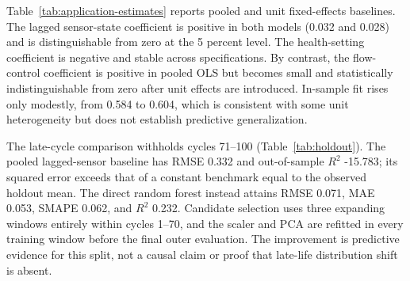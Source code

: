 \documentclass[article]{jss}
\begin{document}
\begin{table}[t!]
\centering
\small
\setlength{\tabcolsep}{4.5pt}
\renewcommand{\arraystretch}{1.16}

\caption{\label{tab:application-design} Leakage-controlled N-CMAPSS application design. Source: Author's computation from the processed N-CMAPSS DS01 panel (Artifacts 01 and 05). Notes: The target is a risk proxy derived from RUL. Lagged risk and lagged RUL are excluded because they encode a deterministic countdown identity.}
\end{table}


Table~\ref{tab:application-estimates} reports pooled and unit fixed-effects baselines. The lagged sensor-state
coefficient is positive in both models (0.032 and 0.028) and is distinguishable from zero at the 5 percent level.
The health-setting coefficient is negative and stable across specifications. By contrast, the flow-control
coefficient is positive in pooled OLS but becomes small and statistically indistinguishable from zero after unit
effects are introduced. In-sample fit rises only modestly, from 0.584 to 0.604, which is consistent with some
unit heterogeneity but does not establish predictive generalization.

\begin{table}[t!]
\centering
\small
\setlength{\tabcolsep}{4.5pt}
\renewcommand{\arraystretch}{1.16}

\caption{\label{tab:application-estimates} N-CMAPSS lagged-sensor baseline estimates. Source: Author's computation using statsmodels with HC1 covariance (Artifacts 02 and 03). Notes: HC1 standard errors are in parentheses. Unit fixed effects are included in the second column but their individual coefficients are omitted from display.}
\end{table}


\FloatBarrier

The late-cycle comparison withholds cycles 71--100 (Table~\ref{tab:holdout}). The pooled lagged-sensor baseline
has RMSE 0.332 and out-of-sample $R^2$ -15.783; its squared error exceeds
that of a constant benchmark equal to the observed holdout mean. The direct random forest instead attains RMSE
0.071, MAE 0.053, SMAPE 0.062, and $R^2$
0.232. Candidate selection uses three expanding windows entirely within cycles 1--70, and
the scaler and PCA are refitted in every training window before the final outer evaluation. The improvement is
predictive evidence for this split, not a causal claim or proof that late-life distribution shift is absent.
\end{document}
